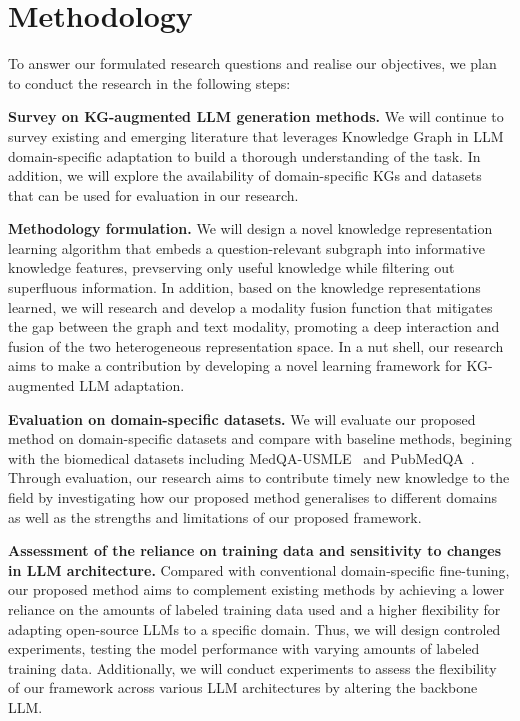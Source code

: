 \section*{Methodology}

To answer our formulated research questions and realise our objectives, we plan to conduct the research in the following steps:

\textbf{Survey on KG-augmented LLM generation methods. } 
We will continue to survey existing and emerging literature that leverages Knowledge Graph in LLM domain-specific adaptation to build a thorough understanding of the task. 
In addition, we will explore the availability of domain-specific KGs and datasets that can be used for evaluation in our research.

\textbf{Methodology formulation. }
We will design a novel knowledge representation learning algorithm that embeds a question-relevant subgraph into informative knowledge features, prevserving only useful knowledge while filtering out superfluous information. 
In addition, based on the knowledge representations learned, we will research and develop a modality fusion function that mitigates the gap between the graph and text modality, promoting a deep interaction and fusion of the two heterogeneous representation space. 
In a nut shell, our research aims to make a contribution by developing a novel learning framework for KG-augmented LLM adaptation. 

\textbf{Evaluation on domain-specific datasets. } 
We will evaluate our proposed method on domain-specific datasets and compare with baseline methods, begining with the biomedical datasets including MedQA-USMLE~\parencite{medqa} and PubMedQA~\parencite{pubmedqa}.
Through evaluation, our research aims to contribute timely new knowledge to the field by investigating how our proposed method generalises to different domains as well as the strengths and limitations of our proposed framework. 

\textbf{Assessment of the reliance on training data and sensitivity to changes in LLM architecture. }
Compared with conventional domain-specific fine-tuning, our proposed method aims to complement existing methods by achieving a lower reliance on the amounts of labeled training data used and a higher flexibility for adapting open-source LLMs to a specific domain.
Thus, we will design controled experiments, testing the model performance with varying amounts of labeled training data. 
Additionally, we will conduct experiments to assess the flexibility of our framework across various LLM architectures by altering the backbone LLM.
